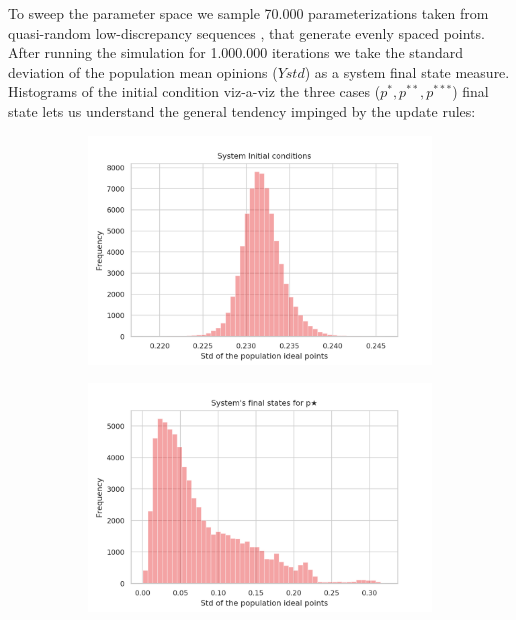 \documentclass{article}
\begin{document}
To sweep the parameter space we sample 70.000 parameterizations taken from
quasi-random low-discrepancy sequences \cite{saltelli2008global}, that generate
evenly spaced points. After running the simulation for 1.000.000 iterations we
take the  standard deviation of the population mean opinions (\(Ystd\)) as
a system final state measure. Histograms of the initial condition viz-a-viz
the three cases (\(p^{*}, p^{**}, p^{***}\)) final state lets us understand the
general tendency impinged by the update rules:

\begin{figure}[H]
  \centering
  
    \begin{subfigure}[b]{0.49\textwidth}
      \includegraphics[width=\textwidth]{img/initstd.png}
    \end{subfigure}
    \begin{subfigure}[b]{0.49\textwidth}
      \includegraphics[width=\textwidth]{img/Ystd*.png}
     \end{subfigure}


\end{figure}
\end{document}
